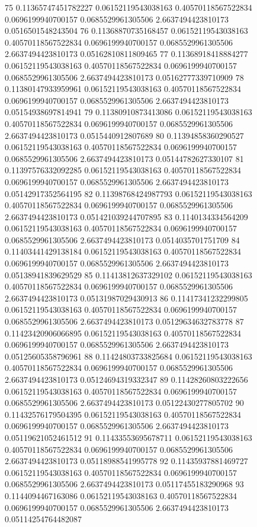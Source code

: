 {75 0.11365747451782227 0.06152119543038163 0.40570118567522834 0.0696199940700157 0.0685529961305506 2.6637494423810173 0.0516501548243504
76 0.11368870735168457 0.06152119543038163 0.40570118567522834 0.0696199940700157 0.0685529961305506 2.6637494423810173 0.05162810811809465
77 0.11368918418884277 0.06152119543038163 0.40570118567522834 0.0696199940700157 0.0685529961305506 2.6637494423810173 0.05162777339710909
78 0.11380147933959961 0.06152119543038163 0.40570118567522834 0.0696199940700157 0.0685529961305506 2.6637494423810173 0.05154938697814941
79 0.11380910873413086 0.06152119543038163 0.40570118567522834 0.0696199940700157 0.0685529961305506 2.6637494423810173 0.0515440912807689
80 0.11394858360290527 0.06152119543038163 0.40570118567522834 0.0696199940700157 0.0685529961305506 2.6637494423810173 0.05144782627330107
81 0.11397576332092285 0.06152119543038163 0.40570118567522834 0.0696199940700157 0.0685529961305506 2.6637494423810173 0.05142917352564195
82 0.11398768424987793 0.06152119543038163 0.40570118567522834 0.0696199940700157 0.0685529961305506 2.6637494423810173 0.051421039244707895
83 0.1140134334564209 0.06152119543038163 0.40570118567522834 0.0696199940700157 0.0685529961305506 2.6637494423810173 0.0514035701751709
84 0.11403441429138184 0.06152119543038163 0.40570118567522834 0.0696199940700157 0.0685529961305506 2.6637494423810173 0.05138941839629529
85 0.11413812637329102 0.06152119543038163 0.40570118567522834 0.0696199940700157 0.0685529961305506 2.6637494423810173 0.05131987029430913
86 0.11417341232299805 0.06152119543038163 0.40570118567522834 0.0696199940700157 0.0685529961305506 2.6637494423810173 0.05129634632783778
87 0.11423420906066895 0.06152119543038163 0.40570118567522834 0.0696199940700157 0.0685529961305506 2.6637494423810173 0.05125605358796961
88 0.11424803733825684 0.06152119543038163 0.40570118567522834 0.0696199940700157 0.0685529961305506 2.6637494423810173 0.05124694319332347
89 0.11428260803222656 0.06152119543038163 0.40570118567522834 0.0696199940700157 0.0685529961305506 2.6637494423810173 0.05122430277805702
90 0.11432576179504395 0.06152119543038163 0.40570118567522834 0.0696199940700157 0.0685529961305506 2.6637494423810173 0.05119621052461512
91 0.11433553695678711 0.06152119543038163 0.40570118567522834 0.0696199940700157 0.0685529961305506 2.6637494423810173 0.05118988541995778
92 0.11435937881469727 0.06152119543038163 0.40570118567522834 0.0696199940700157 0.0685529961305506 2.6637494423810173 0.05117455183290968
93 0.1144094467163086 0.06152119543038163 0.40570118567522834 0.0696199940700157 0.0685529961305506 2.6637494423810173 0.05114254764482087
}
